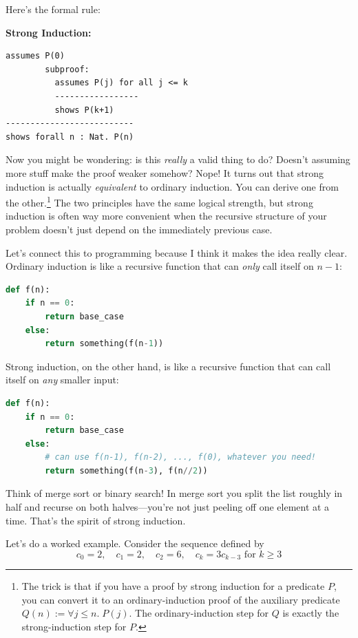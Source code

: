 \documentclass[11pt]{article}
\begin{document}
Here's the formal rule:

\noindent\textbf{Strong Induction:}
\begin{lstlisting}
assumes P(0)
        subproof:
          assumes P(j) for all j <= k
          -----------------
          shows P(k+1)
--------------------------
shows forall n : Nat. P(n)
\end{lstlisting}

Now you might be wondering: is this \emph{really} a valid thing to do? Doesn't assuming more stuff make the proof weaker somehow? Nope! It turns out that strong induction is actually \emph{equivalent} to ordinary induction. You can derive one from the other.\footnote{The trick is that if you have a proof by strong induction for a predicate $P$, you can convert it to an ordinary-induction proof of the auxiliary predicate $Q(n) := \forall j \leq n.\; P(j)$. The ordinary-induction step for $Q$ is exactly the strong-induction step for $P$.} The two principles have the same logical strength, but strong induction is often way more convenient when the recursive structure of your problem doesn't just depend on the immediately previous case.

Let's connect this to programming because I think it makes the idea really clear. Ordinary induction is like a recursive function that can \emph{only} call itself on $n-1$:

\begin{lstlisting}[language=Python]
def f(n):
    if n == 0:
        return base_case
    else:
        return something(f(n-1))
\end{lstlisting}

Strong induction, on the other hand, is like a recursive function that can call itself on \emph{any} smaller input:

\begin{lstlisting}[language=Python]
def f(n):
    if n == 0:
        return base_case
    else:
        # can use f(n-1), f(n-2), ..., f(0), whatever you need!
        return something(f(n-3), f(n//2))
\end{lstlisting}

Think of merge sort or binary search! In merge sort you split the list roughly in half and recurse on both halves---you're not just peeling off one element at a time. That's the spirit of strong induction.

Let's do a worked example. Consider the sequence defined by
\[
c_0 = 2, \quad c_1 = 2, \quad c_2 = 6, \quad c_k = 3c_{k-3} \text{ for } k \geq 3
\]
\end{document}
